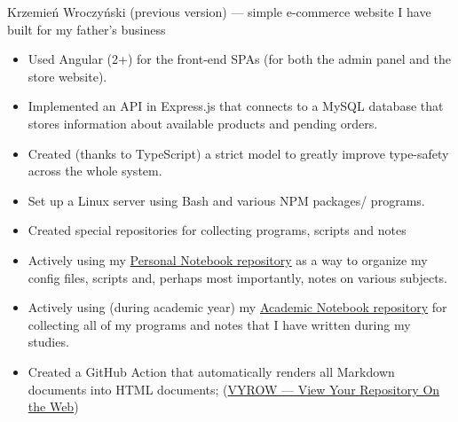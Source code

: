 \documentclass[10pt,a4paper,ragged2e,withhyper]{altacv}
\begin{document}
\begin{paracol}{2}



\small Krzemień Wroczyński (previous version) — simple e-commerce website I have built for my father’s business
\smallskip

\begin{itemize}
\item Used Angular (2+) for the front-end SPAs (for both the admin panel and the store website).
\item Implemented an API in Express.js that connects to a MySQL database that stores information about available products and pending orders.
\item Created (thanks to TypeScript) a strict model to greatly improve type-safety across the whole system.
\item Set up a Linux server using Bash and various NPM packages/ programs.
\end{itemize}

\divider

\begin{itemize}
\item Created special repositories for collecting programs, scripts and notes
\item Actively using my \href{https://personal.jerry-sky.me}{Personal Notebook repository} as a way to organize my config files, scripts and, perhaps most importantly, notes on various subjects.
\item Actively using (during academic year) my \href{https://academic.jerry-sky.me}{Academic Notebook repository} for collecting all of my programs and notes that I have written during my studies.
\item Created a GitHub Action that automatically renders all Markdown documents into HTML documents; (\href{https://github.com/marketplace/actions/vyrow}{VYROW — View Your Repository On the Web})
\end{itemize}

\divider


\end{paracol}
\end{document}
